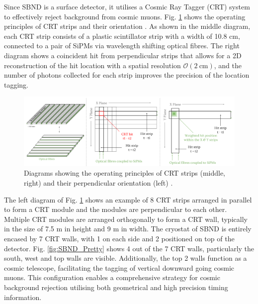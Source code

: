 Since SBND is a surface detector, it utilises a Cosmic Ray Tagger (CRT) system to effectively reject background from cosmic muons.
Fig. \ref{fig:SBND_CRT} shows the operating principles of CRT strips and their orientation \cite{RhiannonPhD}.
As shown in the middle diagram, each CRT strip consists of a plastic scintillator strip with a width of 10.8 cm, connected to a pair of SiPMs via wavelength shifting optical fibres.       
The right diagram shows a coincident hit from perpendicular strips that allows for a 2D reconstruction of the hit location with a spatial resolution $\mathcal{O}(2~\mathrm{cm})$, and the number of photons collected for each strip improves the precision of the location tagging.
\begin{figure}[b!] 
\centering    
\includegraphics[width=1.0\textwidth]{SBND_CRT}
\caption[Cosmic Ray Tagger Diagrams]{
Diagrams showing the operating principles of CRT strips (middle, right) and their perpendicular orientation (left) \cite{RhiannonPhD}.
}
\label{fig:SBND_CRT}
\end{figure}

The left diagram of Fig. \ref{fig:SBND_CRT} shows an example of 8 CRT strips arranged in parallel to form a CRT module and the modules are perpendicular to each other.
Multiple CRT modules are arranged orthogonally to form a CRT wall, typically in the size of 7.5 m in height and 9 m in width.
The cryostat of SBND is entirely encased by 7 CRT walls, with 1 on each side and 2 positioned on top of the detector.
Fig. \ref{fig:SBND_Pretty} shows 4 out of the 7 CRT walls, particularly the south, west and top walls are visible.
Additionally, the top 2 walls function as a cosmic telescope, facilitating the tagging of vertical downward going cosmic muons.
This configuration enables a comprehensive strategy for cosmic background rejection utilising both geometrical and high precision timing information.

